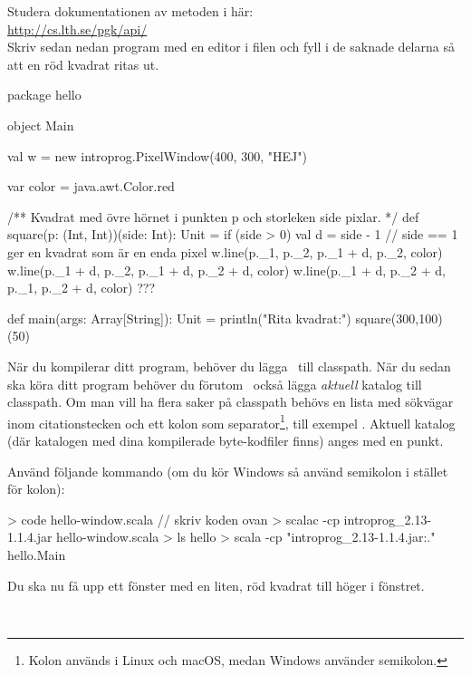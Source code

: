 \Subtask Studera dokumentationen av metoden  i  här:\\ \url{http://cs.lth.se/pgk/api/}
\\ Skriv sedan nedan program med en editor i filen  och fyll i de saknade delarna så att en röd kvadrat ritas ut.

\begin{Code}
package hello

object Main {
  val w = new introprog.PixelWindow(400, 300, "HEJ")

  var color = java.awt.Color.red

  /** Kvadrat med övre hörnet i punkten p och storleken side pixlar. */
  def square(p: (Int, Int))(side: Int): Unit = if (side > 0) {
    val d = side - 1  // side == 1 ger en kvadrat som är en enda pixel
    w.line(p._1,     p._2,     p._1 + d, p._2,     color)
    w.line(p._1 + d, p._2,     p._1 + d, p._2 + d, color)
    w.line(p._1 + d, p._2 + d, p._1,     p._2 + d, color)
    ???
  }

  def main(args: Array[String]): Unit = {
    println("Rita kvadrat:")
    square(300,100)(50)
  }
}
\end{Code}

\noindent
När du kompilerar ditt program, behöver du lägga \LibJar~till classpath.
När du sedan ska köra ditt program behöver du förutom  \LibJar~också lägga \emph{aktuell} katalog till classpath. Om man vill ha flera saker på classpath behövs en lista med sökvägar inom citationstecken och ett kolon som separator\footnote{Kolon används i Linux och macOS, medan Windows använder semikolon.}, till exempel .
Aktuell katalog (där katalogen  med dina kompilerade byte-kodfiler finns) anges med en punkt.

Använd följande kommando (om du kör Windows så använd semikolon i stället för kolon):
\begin{REPL}
> code hello-window.scala  // skriv koden ovan
> scalac -cp introprog_2.13-1.1.4.jar hello-window.scala
> ls hello
> scala -cp "introprog_2.13-1.1.4.jar:." hello.Main
\end{REPL}
\noindent Du ska nu få upp ett fönster med en liten, röd kvadrat till höger i fönstret.


\SOLUTION

\TaskSolved \what~

